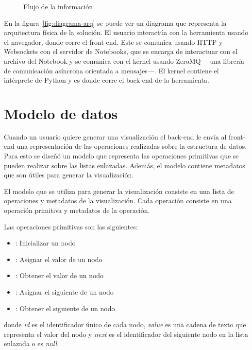 \begin{figure}[htb]
    \centering
    
    \caption{Flujo de la información}
    \label{fig:flujo-informacion}
\end{figure}

En la figura~\ref{fig:diagrama-arq} se puede ver un diagrama que representa la arquitectura física de la solución. El usuario interactúa con la herramienta usando el navegador, donde corre el front-end. Este se comunica usando HTTP y Websockets con el servidor de Notebooks, que se encarga de interactuar con el archivo del Notebook y se comunica con el kernel usando ZeroMQ ---una librería de comunicación asíncrona orientada a mensajes---. El kernel contiene el intérprete de Python y es donde corre el back-end de la herramienta.

\section{Modelo de datos}

Cuando un usuario quiere generar una visualización el back-end le envía al front-end una representación de las operaciones realizadas sobre la estructura de datos. Para esto se diseñó un modelo que representa las operaciones primitivas que se pueden realizar sobre las listas enlazadas. Además, el modelo contiene metadatos que son útiles para generar la visualización.

El modelo que se utiliza para generar la visualización consiste en una lista de operaciones y metadatos de la visualización. Cada operación consiste en una operación primitiva y metadatos de la operación.

Las operaciones primitivas son las siguientes:
\begin{itemize}
    \item{}: Inicializar un nodo
    \item{}: Asignar el valor de un nodo
    \item{}: Obtener el valor de un nodo
    \item{}: Asignar el siguiente de un nodo
    \item{}: Obtener el siguiente de un nodo
\end{itemize}
donde \textit{id} es el identificador único de cada nodo, \textit{value} es una cadena de texto que representa el valor del nodo y \textit{next} es el identificador del siguiente nodo en la lista enlazada o es \textit{null}.

